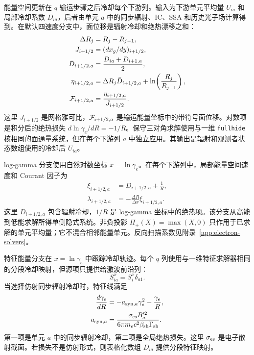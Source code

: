 \documentclass[twocolumn]{aastex702}
\begin{document}
能量空间更新在 \(q\) 输运步骤之后冷却每个下游列。输入为下游单元平均量 \(U_{ia}\) 和局部冷却系数 \(D_{ia}\)，后者由单元 \(a\) 中的同步辐射、IC、SSA 和历史光子场计算得到。在默认四速度分支中，面位移是辐射冷却和绝热漂移之和：
\begin{equation}
\begin{aligned}
\Delta R_j&=R_j-R_{j-1},\\
J_{i+1/2}&=(dx_g/dy)_{i+1/2},\\
\bar D_{i+1/2,a}&=\frac{D_{ia}+D_{i+1,a}}{2},\\
\eta_{i+1/2,a}
&=\Delta R_j\bar D_{i+1/2,a}
+\ln\!\left(\frac{R_j}{R_{j-1}}\right),\\
{\cal F}_{i+1/2,a}
&=\frac{\eta_{i+1/2,a}}{J_{i+1/2}} .
\end{aligned}
\end{equation}
这里 \(J_{i+1/2}\) 是网格雅可比，\({\cal F}_{i+1/2,a}\) 是输运能量坐标中的带符号面位移。对数项是积分后的绝热损失 \(d\ln\gamma_e/dR=-1/R\)。保守三对角求解使用与一维 \texttt{fullhide} 核相同的面通量系统，但在每个下游列 \(a\) 中独立应用。其输出是辐射和观测者状态数组使用的冷却后 \(U_{ia}\)。

log-gamma 分支使用自然对数坐标 \(x=\ln\gamma_e\)。在每个下游列中，局部能量空间速度和 Courant 因子为
\begin{equation}
\begin{aligned}
\xi_{i+1/2,a}
&=D_{i+1/2,a}+\frac{1}{R},\\
\lambda_{i+1/2,a}
&=-\frac{\Delta R}{\Delta x}\xi_{i+1/2,a}.
\end{aligned}
\end{equation}
这里 \(D_{i+1/2,a}\) 包含辐射冷却，\(1/R\) 是 log-gamma 坐标中的绝热项。该分支从高能到低能求解所得单侧隐式系统。非负投影 \(\Pi_+(X)=\max(X,0)\) 只作用于已求解的单元平均量；它不混合相邻能量单元。反向扫描系数见附录~\ref{app:electron-solvers}。

特征能量分支在 \(x=\ln\gamma_e\) 中跟踪冷却轨迹。每个 \(q\) 列使用与一维特征求解器相同的分段冷却映射，但源项只提供给激波前沿列：
\begin{equation}
S_{ia}^{x}=S_i^x\delta_{a1}.
\end{equation}
当选择仿射同步辐射冷却时，特征线满足
\begin{equation}
\begin{aligned}
\frac{d\gamma_e}{dR}
&=-a_{{\rm syn},a}\gamma_e^2-\frac{\gamma_e}{R},\\
a_{{\rm syn},a}
&=\frac{\sigma_{\rm es} B_a'^2}{6\pi m_e c^2\beta_{\rm sh}\Gamma_{\rm sh}} .
\end{aligned}
\end{equation}
第一项是单元 \(a\) 中的同步辐射冷却，第二项是全局绝热损失。这里 \(\sigma_{\rm es}\) 是电子散射截面。若损失不是仿射形式，则表格化数组 \(D_{ia}\) 提供分段特征映射。
\end{document}
